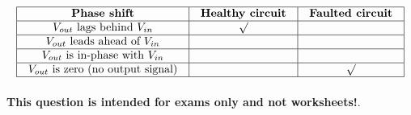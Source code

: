 $$\vbox{\offinterlineskip
\halign{\strut
\vrule \quad\hfil # \ \hfil & 
\vrule \quad\hfil # \ \hfil & 
\vrule \quad\hfil # \ \hfil \vrule \cr
\noalign{\hrule}
%
{\bf Phase shift} & {\bf Healthy circuit} & {\bf Faulted circuit} \cr
%
\noalign{\hrule}
%
$V_{out}$ lags behind $V_{in}$ & $\surd$ &  \cr
%
\noalign{\hrule}
%
$V_{out}$ leads ahead of $V_{in}$ &  &  \cr
%
\noalign{\hrule}
%
$V_{out}$ is in-phase with $V_{in}$ &  &  \cr
%
\noalign{\hrule}
%
$V_{out}$ is zero (no output signal) &  & $\surd$ \cr
%
\noalign{\hrule}
} %
}$$ %








{\bf This question is intended for exams only and not worksheets!}.



